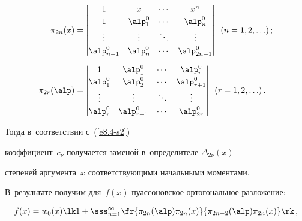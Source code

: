 \begin{align*}

\pi_{2n} (x)& = \begin{vmatrix}

    1&x&\cdots&x^n\\[2pt]

    1&\alp_1^0&\cdots&\alp_n^0\\[2pt]

    \vdots&\vdots&\ddots&\vdots\\[2pt]

    \alp_{n-1}^0&\alp_n^0&\cdots&\alp_{2n-1}^0\end{vmatrix}

     \enskip 

    (n=1,2,\ldots)\,;


    \\[6pt]

\pi_{2r} (\alp) &= \begin{vmatrix}

    1&\alp_1^0&\cdots&\alp_r^0\\[2pt]

    \alp_1^0&\alp_2^0&\cdots&\alp_{r+1}^0\\[2pt]

    \vdots&\vdots&\ddots&\vdots\\[2pt]

    \alp_{r}^0&\alp_{r+1}^0&\cdots&\alp_{2r}^0\end{vmatrix}

     \enskip (r=1,2,\ldots)\,.


     \end{align*}

Тогда в~соответствии с~(\ref{e8.4-s2}) 

коэффициент~$c_\nu$ получается заменой в~определителе $\Delta_{2\nu} (x)$ 

степеней аргумента~$x$ соответствующими начальными моментами. 

В~результате получим для~$f(x)$ пуассоновское ортогональное разложение:

\begin{equation*}

f(x) = w_0(x) \lk 1 + \sss_{n=1}^\infty \fr{\pi_{2n} (\alp) \pi_{2n}(x)}

{\pi_{2n-2} (\alp) \pi_{2n}(x)}\rk\,,


\end{equation*}

